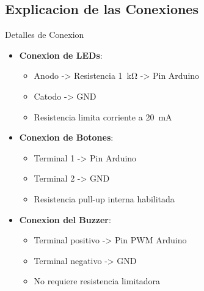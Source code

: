 \subsection{Explicacion de las Conexiones}
\begin{componentBox}{Detalles de Conexion}
	\begin{itemize}[leftmargin=*,itemsep=1pt,parsep=1pt]
		\item \textbf{Conexion de LEDs}:
		\begin{itemize}[itemsep=0pt,parsep=0pt]
			\item Anodo -> Resistencia \SI{1}{\kilo\ohm} -> Pin Arduino
			\item Catodo -> GND
			\item Resistencia limita corriente a \SI{20}{\milli\ampere}
		\end{itemize}
		
		\item \textbf{Conexion de Botones}:
		\begin{itemize}[itemsep=0pt,parsep=0pt]
			\item Terminal 1 -> Pin Arduino
			\item Terminal 2 -> GND
			\item Resistencia pull-up interna habilitada
		\end{itemize}
		
		\item \textbf{Conexion del Buzzer}:
		\begin{itemize}[itemsep=0pt,parsep=0pt]
			\item Terminal positivo -> Pin PWM Arduino
			\item Terminal negativo -> GND
			\item No requiere resistencia limitadora
		\end{itemize}
	\end{itemize}
\end{componentBox}

